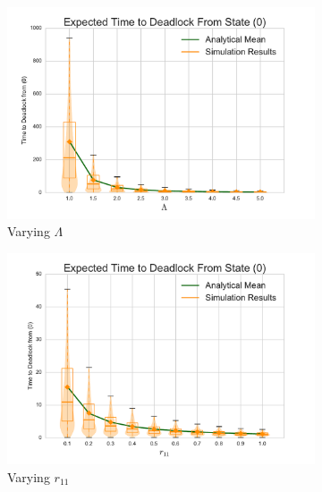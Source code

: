 \documentclass{article}
\begin{document}
\begin{figure}[!htbp]
\begin{center}
\begin{subfigure}[b]{0.35\textwidth}
  \includegraphics[width=\textwidth]{images/varyL}
  \caption{Varying $\Lambda$}
  \label{fig:timestodeadlock_L}
\end{subfigure}
\begin{subfigure}[b]{0.35\textwidth}
  \includegraphics[width=\textwidth]{images/varyr11}
  \caption{Varying $r_{11}$}
  \label{fig:timestodeadlock_r11}
\end{subfigure}\\
\begin{subfigure}[b]{0.35\textwidth}

\end{subfigure}
\end{center}
\end{figure}
\end{document}
